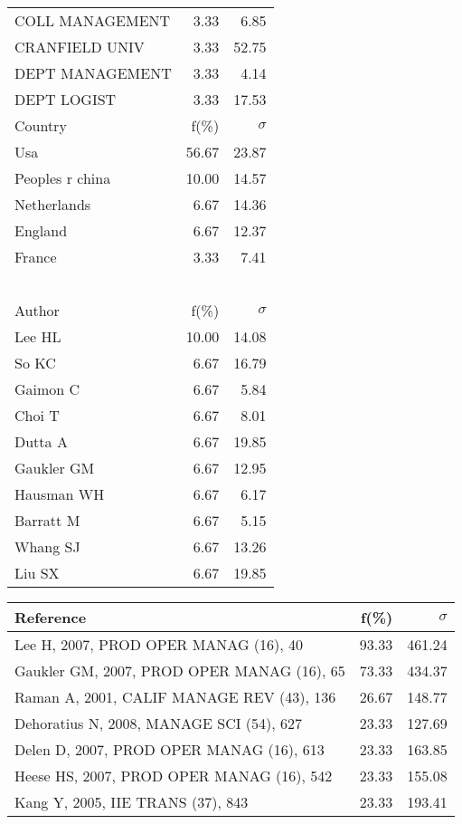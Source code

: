 \documentclass[a4paper,11pt]{report}
\begin{document}
\begin{landscape}
\begin{table}[!ht]
{\begin{tabular}{|l r r|}
COLL MANAGEMENT & 3.33 & 6.85\\
CRANFIELD UNIV & 3.33 & 52.75\\
DEPT MANAGEMENT & 3.33 & 4.14\\
DEPT LOGIST & 3.33 & 17.53\\
\hline
\hline
Country & f(\%) & $\sigma$\\
\hline
Usa & 56.67 & 23.87\\
Peoples r china & 10.00 & 14.57\\
Netherlands & 6.67 & 14.36\\
England & 6.67 & 12.37\\
France & 3.33 & 7.41\\
 &  & \\
 &  & \\
 &  & \\
 &  & \\
 &  & \\
\hline
\hline
Author & f(\%) & $\sigma$\\
\hline
Lee HL & 10.00 & 14.08\\
So KC & 6.67 & 16.79\\
Gaimon C & 6.67 & 5.84\\
Choi T & 6.67 & 8.01\\
Dutta A & 6.67 & 19.85\\
Gaukler GM & 6.67 & 12.95\\
Hausman WH & 6.67 & 6.17\\
Barratt M & 6.67 & 5.15\\
Whang SJ & 6.67 & 13.26\\
Liu SX & 6.67 & 19.85\\
\hline
\end{tabular}
}
{\scriptsize\begin{tabular}{|l r r|}
\hline
Reference & f(\%) & $\sigma$\\
\hline
Lee H, 2007, PROD OPER MANAG (16), 40 & 93.33 & 461.24\\
Gaukler GM, 2007, PROD OPER MANAG (16), 65 & 73.33 & 434.37\\
Raman A, 2001, CALIF MANAGE REV (43), 136 & 26.67 & 148.77\\
Dehoratius N, 2008, MANAGE SCI (54), 627 & 23.33 & 127.69\\
Delen D, 2007, PROD OPER MANAG (16), 613 & 23.33 & 163.85\\
Heese HS, 2007, PROD OPER MANAG (16), 542 & 23.33 & 155.08\\
Kang Y, 2005, IIE TRANS (37), 843 & 23.33 & 193.41\\

\end{tabular}}
\end{table}
\end{landscape}
\end{document}
